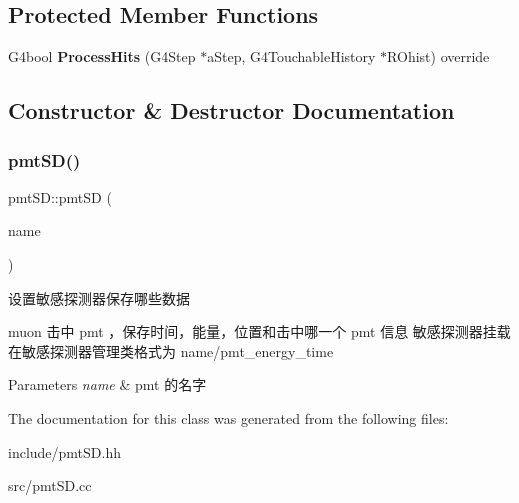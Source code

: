 \subsection*{Protected Member Functions}
\begin{DoxyCompactItemize}
\item 
\mbox{\label{classpmtSD_a5d557bd42f85305418f6ddd7e4bcfe7a}} 
G4bool {\bfseries Process\+Hits} (G4\+Step $\ast$a\+Step, G4\+Touchable\+History $\ast$R\+Ohist) override
\end{DoxyCompactItemize}


\subsection{Constructor \& Destructor Documentation}
\mbox{\label{classpmtSD_ae7746efb08ea75673a718fd342d243ea}} 
\subsubsection{\texorpdfstring{pmt\+S\+D()}{pmtSD()}}
{\footnotesize\ttfamily pmt\+S\+D\+::pmt\+SD (\begin{DoxyParamCaption}\item[{G4\+String}]{name }\end{DoxyParamCaption})}



设置敏感探测器保存哪些数据 

muon 击中 pmt ，保存时间，能量，位置和击中哪一个 pmt 信息 敏感探测器挂载在敏感探测器管理类格式为 name/pmt\+\_\+energy\+\_\+time 
\begin{DoxyParams}{Parameters}
{\em name} & pmt 的名字 \\
\hline
\end{DoxyParams}


The documentation for this class was generated from the following files\+:\begin{DoxyCompactItemize}
\item 
include/pmt\+S\+D.\+hh\item 
src/pmt\+S\+D.\+cc\end{DoxyCompactItemize}
